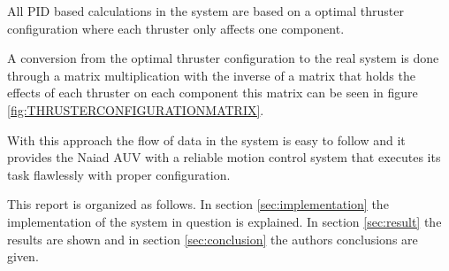 All PID based calculations in the system are based on a optimal thruster configuration where each thruster only affects one component.

A conversion from the optimal thruster configuration to the real system is done through a matrix multiplication with the inverse of a matrix that holds the effects of each thruster on each component this matrix can be seen in figure \ref{fig:THRUSTERCONFIGURATIONMATRIX}.

With this approach the flow of data in the system is easy to follow and it provides the Naiad AUV with a reliable motion control system that executes its task flawlessly with proper configuration.

This report is organized as follows. In section \ref{sec:implementation} the implementation of the system in question is explained. In section \ref{sec:result} the results are shown and in section \ref{sec:conclusion} the authors conclusions are given. 
